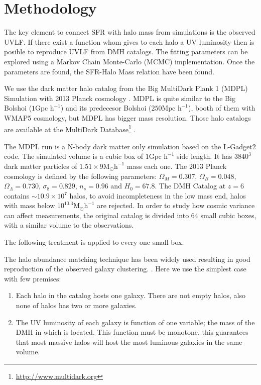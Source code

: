 \section{Methodology}

The key element to connect SFR with halo mass from simulations is the observed UVLF. 
If there exist a function whom gives to each halo a UV luminosity then is posible to 
reproduce UVLF from DMH catalogs. The fitting parameters can be explored using a 
Markov Chain Monte-Carlo (MCMC) implementation. Once the parameters are found, 
the SFR-Halo Mass relation have been found.

We use the dark matter halo catalog from the Big MultiDark Plank 1 (MDPL) Simulation 
\citep{klypin14} with 2013 Planck cosmology \citep{planck1}. MDPL is quite similar to the 
Big Bolshoi ($1 \textrm{Gpc h}^{-1}$) \citep{prada12} and 
its predecesor Bolshoi \citep{klypin11} ($250 \textrm{Mpc h}^{-1}$), booth of them with 
WMAP5 cosmology, but MDPL has bigger mass resolution.  Those halo catalogs are 
available at the MultiDark Database\footnote{\url{http://www.multidark.org}} 
\citep{riebe13}.

The MDPL run is a N-body dark matter only simulation based on the L-Gadget2 
code. The simulated volume is a cubic box of $1 \textrm{Gpc h}^{-1}$ side length. 
It has $3840^3$ dark matter particles of 
$1.51\times 9 \textrm{M}_{\odot} \textrm{h}^{-1}$ mass each one.
The 2013 Planck cosmology is defined by the following parameters: $\Omega_M = 0.307$, 
$\Omega_B = 0.048$, $\Omega_\Lambda = 0.730$, $\sigma_8 = 0.829$, $n_s = 0.96$ and 
$H_0 = 67.8$. The DMH Catalog at $z=6$ contains $\sim 10.9 \times 10^7$ 
halos, to avoid incompleteness in the low mass end, halos with mass below 
$10^{10.3} \textrm{M}_{\odot} \textrm{h}^{-1}$ are rejected. In order to study how 
cosmic variance can affect measurements, the original catalog is divided into 64 small 
cubic boxes, with a similar volume to the observations.

The following treatment is applied to every one small box.

The halo abundance matching technique has been widely used \citep{colin99, kravtsov04}
resulting in good reproduction of the observed galaxy clustering. \citep{conroy06, lee09}. 
Here we use the simplest case with few premises: 
\begin{enumerate}
 \item Each halo in the catalog hosts one galaxy. There are not empty
halos, also none of halos has two or more galaxies.
 \item The UV luminosity of each galaxy is function of one variable; the mass of
the DMH in which is located. This function must be monotone, this guarantees that most 
massive halos will host the most luminous galaxies in the same volume.
\end{enumerate}

